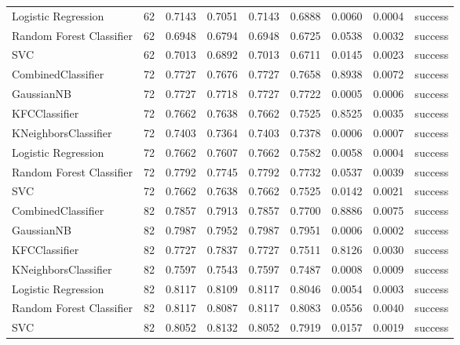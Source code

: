 \begin{table}
\begin{tabular}{lrrrrrrrl}
Logistic Regression & 62 & 0.7143 & 0.7051 & 0.7143 & 0.6888 & 0.0060 & 0.0004 & success \\
Random Forest Classifier & 62 & 0.6948 & 0.6794 & 0.6948 & 0.6725 & 0.0538 & 0.0032 & success \\
SVC & 62 & 0.7013 & 0.6892 & 0.7013 & 0.6711 & 0.0145 & 0.0023 & success \\
CombinedClassifier & 72 & 0.7727 & 0.7676 & 0.7727 & 0.7658 & 0.8938 & 0.0072 & success \\
GaussianNB & 72 & 0.7727 & 0.7718 & 0.7727 & 0.7722 & 0.0005 & 0.0006 & success \\
KFCClassifier & 72 & 0.7662 & 0.7638 & 0.7662 & 0.7525 & 0.8525 & 0.0035 & success \\
KNeighborsClassifier & 72 & 0.7403 & 0.7364 & 0.7403 & 0.7378 & 0.0006 & 0.0007 & success \\
Logistic Regression & 72 & 0.7662 & 0.7607 & 0.7662 & 0.7582 & 0.0058 & 0.0004 & success \\
Random Forest Classifier & 72 & 0.7792 & 0.7745 & 0.7792 & 0.7732 & 0.0537 & 0.0039 & success \\
SVC & 72 & 0.7662 & 0.7638 & 0.7662 & 0.7525 & 0.0142 & 0.0021 & success \\
CombinedClassifier & 82 & 0.7857 & 0.7913 & 0.7857 & 0.7700 & 0.8886 & 0.0075 & success \\
GaussianNB & 82 & 0.7987 & 0.7952 & 0.7987 & 0.7951 & 0.0006 & 0.0002 & success \\
KFCClassifier & 82 & 0.7727 & 0.7837 & 0.7727 & 0.7511 & 0.8126 & 0.0030 & success \\
KNeighborsClassifier & 82 & 0.7597 & 0.7543 & 0.7597 & 0.7487 & 0.0008 & 0.0009 & success \\
Logistic Regression & 82 & 0.8117 & 0.8109 & 0.8117 & 0.8046 & 0.0054 & 0.0003 & success \\
Random Forest Classifier & 82 & 0.8117 & 0.8087 & 0.8117 & 0.8083 & 0.0556 & 0.0040 & success \\
SVC & 82 & 0.8052 & 0.8132 & 0.8052 & 0.7919 & 0.0157 & 0.0019 & success \\
\bottomrule
\end{tabular}
\end{table}
